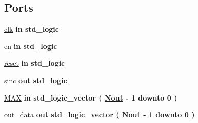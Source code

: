 \subsection*{Ports}
 \begin{DoxyCompactItemize}
\item 
\hyperlink{classintegrador_a4a4609c199d30b3adebbeb3a01276ec5}{clk}  {\bfseries {\bfseries \textcolor{keywordflow}{in}\textcolor{vhdlchar}{ }}} {\bfseries \textcolor{comment}{std\+\_\+logic}\textcolor{vhdlchar}{ }} 
\item 
\hyperlink{classintegrador_adcf9c6f5161d039addbda5819bee64a3}{en}  {\bfseries {\bfseries \textcolor{keywordflow}{in}\textcolor{vhdlchar}{ }}} {\bfseries \textcolor{comment}{std\+\_\+logic}\textcolor{vhdlchar}{ }} 
\item 
\hyperlink{classintegrador_aad8dc6359d9e23dabcbf342fadf2fa06}{reset}  {\bfseries {\bfseries \textcolor{keywordflow}{in}\textcolor{vhdlchar}{ }}} {\bfseries \textcolor{comment}{std\+\_\+logic}\textcolor{vhdlchar}{ }} 
\item 
\hyperlink{classintegrador_aae281cf725515894f893258c629a59c7}{sinc}  {\bfseries {\bfseries \textcolor{keywordflow}{out}\textcolor{vhdlchar}{ }}} {\bfseries \textcolor{comment}{std\+\_\+logic}\textcolor{vhdlchar}{ }} 
\item 
\hyperlink{classintegrador_a436836a2e79668e0976eef3a553b5406}{M\+A\+X}  {\bfseries {\bfseries \textcolor{keywordflow}{in}\textcolor{vhdlchar}{ }}} {\bfseries \textcolor{comment}{std\+\_\+logic\+\_\+vector}\textcolor{vhdlchar}{ }\textcolor{vhdlchar}{(}\textcolor{vhdlchar}{ }\textcolor{vhdlchar}{ }\textcolor{vhdlchar}{ }\textcolor{vhdlchar}{ }{\bfseries \hyperlink{classintegrador_a061c0d632c8bdf5dd32c80acf9a9c475}{Nout}} \textcolor{vhdlchar}{-\/}\textcolor{vhdlchar}{ } \textcolor{vhdldigit}{1} \textcolor{vhdlchar}{ }\textcolor{keywordflow}{downto}\textcolor{vhdlchar}{ }\textcolor{vhdlchar}{ } \textcolor{vhdldigit}{0} \textcolor{vhdlchar}{ }\textcolor{vhdlchar}{)}\textcolor{vhdlchar}{ }} 
\item 
\hyperlink{classintegrador_a9e461894ea9b864637648799f51bf9be}{out\+\_\+data}  {\bfseries {\bfseries \textcolor{keywordflow}{out}\textcolor{vhdlchar}{ }}} {\bfseries \textcolor{comment}{std\+\_\+logic\+\_\+vector}\textcolor{vhdlchar}{ }\textcolor{vhdlchar}{(}\textcolor{vhdlchar}{ }\textcolor{vhdlchar}{ }\textcolor{vhdlchar}{ }\textcolor{vhdlchar}{ }{\bfseries \hyperlink{classintegrador_a061c0d632c8bdf5dd32c80acf9a9c475}{Nout}} \textcolor{vhdlchar}{-\/}\textcolor{vhdlchar}{ } \textcolor{vhdldigit}{1} \textcolor{vhdlchar}{ }\textcolor{keywordflow}{downto}\textcolor{vhdlchar}{ }\textcolor{vhdlchar}{ } \textcolor{vhdldigit}{0} \textcolor{vhdlchar}{ }\textcolor{vhdlchar}{)}\textcolor{vhdlchar}{ }} 

\end{DoxyCompactItemize}
